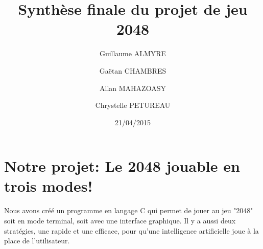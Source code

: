 \documentclass{report}
\begin{document}
\lstset{language=C}

\title{Synthèse finale du projet de jeu 2048}
\author{Guillaume ALMYRE 
\and
Ga\"{e}tan CHAMBRES
\and
Allan MAHAZOASY
\and 
Chrystelle PETUREAU}
\date{21/04/2015}

\maketitle

\tableofcontents

\chapter{Notre projet: Le 2048 jouable en trois modes!}
Nous avons créé un programme en langage C qui permet de jouer au jeu "2048" soit en mode terminal, soit avec une interface graphique. Il y a aussi deux stratégies, une rapide et une efficace, pour qu'une intelligence artificielle joue à la place de l'utilisateur.
\end{document}
